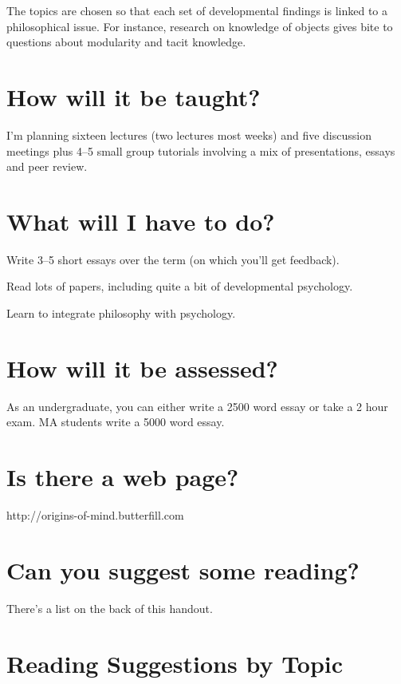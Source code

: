 \documentclass[12pt]{extarticle}
\begin{document}
\begin{multicols}{3}
The topics are chosen so that each set of developmental findings is linked to a philosophical issue. 
For instance, research on knowledge of objects gives bite to questions about modularity and tacit knowledge.  


\section{How will it be taught?}
I’m planning sixteen lectures (two lectures most weeks) and five discussion meetings plus 4--5 small group tutorials involving a mix of presentations, essays and peer review.  


\section{What will I have to do?}
Write 3--5 short essays over the term (on which you’ll get feedback).  

Read lots of papers, including quite a bit of developmental psychology.

Learn to integrate philosophy with psychology.

\section{How will it be assessed?}
As an undergraduate, you can either write a 2500 word essay or take a 2 hour exam.
MA students write a 5000 word essay.





\section{Is there a web page?}
http://origins-of-mind.butterfill.com

\section{Can you suggest some reading?}
There’s a list on the back of this handout.

%



\section{Reading Suggestions by Topic}


\end{multicols}
\end{document}
